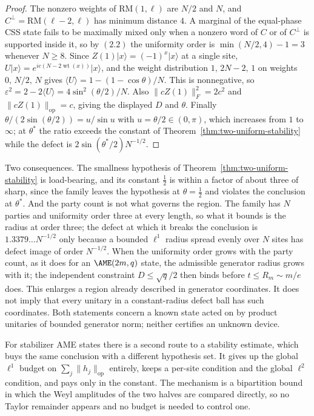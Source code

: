 \begin{proof}
The nonzero weights of \(\mathrm{RM}(1,\ell)\) are \(N/2\) and \(N\), and
\(C^\perp=\mathrm{RM}(\ell-2,\ell)\) has minimum distance \(4\).  A
marginal of the equal-phase CSS state fails to be maximally mixed only when
a nonzero word of \(C\) or of \(C^\perp\) is supported inside it, so by
\((2.2)\) the uniformity order is
\(\min(N/2,4)-1=3\) whenever \(N\geq8\).  Since
\(Z(1)\lvert x\rangle=(-1)^x\lvert x\rangle\) at a single site,
\(U\lvert x\rangle=e^{ic(N-2\operatorname{wt}(x))}\lvert x\rangle\), and
the weight distribution \(1,\,2N-2,\,1\) on weights \(0,\,N/2,\,N\) gives
\(\langle U\rangle=1-(1-\cos\theta)/N\).  This is nonnegative, so
\(\varepsilon^2=2-2\langle U\rangle=4\sin^2(\theta/2)/N\).  Also
\(\lVert cZ(1)\rVert_F^2=2c^2\) and
\(\lVert cZ(1)\rVert_{\mathrm{op}}=c\), giving the displayed \(D\) and
\(\theta\).  Finally \(\theta/(2\sin(\theta/2))=u/\sin u\) with
\(u=\theta/2\in(0,\pi)\), which increases from \(1\) to \(\infty\); at
\(\theta^*\) the ratio exceeds the constant of
Theorem~\ref{thm:two-uniform-stability} while the defect is
\(2\sin(\theta^*/2)N^{-1/2}\).
\end{proof}

\AMEFigureFive

Two consequences.  The smallness hypothesis of
Theorem~\ref{thm:two-uniform-stability} is load-bearing, and its constant
\(\frac12\) is within a factor of about three of sharp, since the family
leaves the hypothesis at \(\theta=\frac12\) and violates the conclusion at
\(\theta^*\).  And the party count is not what governs the region.  The
family has \(N\) parties and uniformity order three at every length, so
what it bounds is the radius at order three; the defect at which it breaks
the conclusion is \(1.3379\ldots N^{-1/2}\) only because a bounded
\(\ell^1\) radius spread evenly over \(N\) sites has defect image of order
\(N^{-1/2}\).  When the uniformity order grows with the party count, as it
does for an \(\AME(2m,q)\) state, the admissible generator radius grows with
it; the independent constraint \(D\leq\sqrt q/2\) then binds before
\(t\leq R_m\sim m/e\) does.  This enlarges a region already described in
generator coordinates.  It does not imply that every unitary in a
constant-radius defect ball has such coordinates.  Both statements concern
a known state acted on by product unitaries of bounded generator norm;
neither certifies an unknown device.

For stabilizer AME states there is a second route to a stability estimate,
which buys the same conclusion with a different hypothesis set.  It gives
up the global \(\ell^1\) budget on \(\sum_j\lVert h_j\rVert_{\mathrm{op}}\)
entirely, keeps a per-site condition and the global \(\ell^2\) condition,
and pays only in the constant.  The mechanism is a bipartition bound in
which the Weyl amplitudes of the two halves are compared directly, so no
Taylor remainder appears and no budget is needed to control one.

